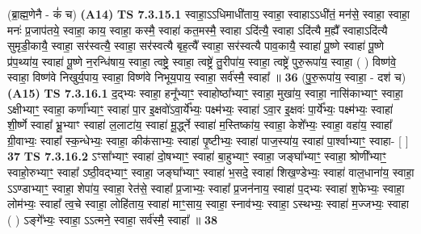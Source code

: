 \documentclass[17pt]{extarticle}
\begin{document}
                      (ब्रा॒ह्म॒णेनै - कं॑ च)  \textbf{(A14)} \newline \newline
                                        \textbf{ TS 7.3.15.1} \newline
                  स्वाहा॒ऽऽधिमाधी॑ताय॒ स्वाहा॒ स्वाहाऽऽधी॑तं॒ मन॑से॒ स्वाहा॒ स्वाहा॒ मनः॑ प्र॒जाप॑तये॒ स्वाहा॒ काय॒ स्वाहा॒ कस्मै॒ स्वाहा॑ कत॒मस्मै॒ स्वाहा ऽदि॑त्यै॒ स्वाहा ऽदि॑त्यै म॒ह्यै᳚ स्वाहाऽदि॑त्यै सुमृडी॒कायै॒ स्वाहा॒ सर॑स्वत्यै॒ स्वाहा॒ सर॑स्वत्यै बृह॒त्यै᳚ स्वाहा॒ सर॑स्वत्यै पाव॒कायै॒ स्वाहा॑ पू॒ष्णे स्वाहा॑ पू॒ष्णे प्र॑प॒थ्या॑य॒ स्वाहा॑ पू॒ष्णे न॒रन्धि॑षाय॒ स्वाहा॒ त्वष्ट्रे॒ स्वाहा॒ त्वष्ट्रे॑ तु॒रीपा॑य॒ स्वाहा॒ त्वष्ट्रे॑ पुरु॒रूपा॑य॒ स्वाहा॒ ( ) विष्ण॑वे॒ स्वाहा॒ विष्ण॑वे निखुर्य॒पाय॒ स्वाहा॒ विष्ण॑वे निभूय॒पाय॒ स्वाहा॒ सर्व॑स्मै॒ स्वाहा᳚ ॥ \textbf{  36 } \newline
                  \newline
                      (पु॒रु॒रूपा॑य॒ स्वाहा॒ - दश॑ च)  \textbf{(A15)} \newline \newline
                                        \textbf{ TS 7.3.16.1} \newline
                  द॒द्भ्यः स्वाहा॒ हनू᳚भ्याꣳ॒॒ स्वाहोष्ठा᳚भ्याꣳ॒॒ स्वाहा॒ मुखा॑य॒ स्वाहा॒ नासि॑काभ्याꣳ॒॒ स्वाहा॒ ऽक्षीभ्याꣳ॒॒ स्वाहा॒ कर्णा᳚भ्याꣳ॒॒ स्वाहा॑ पा॒र इ॒क्षवो॑ऽवा॒र्ये᳚भ्यः॒ पक्ष्म॑भ्यः॒ स्वाहा॑ ऽवा॒र इ॒क्षवः॑ पा॒र्ये᳚भ्यः॒ पक्ष्म॑भ्यः॒ स्वाहा॑ शी॒र्ष्णे स्वाहा᳚ भ्रू॒भ्याꣳ स्वाहा॑ ल॒लाटा॑य॒ स्वाहा॑ मू॒र्द्ध्ने स्वाहा॑ म॒स्तिष्का॑य॒ स्वाहा॒ केशे᳚भ्यः॒ स्वाहा॒ वहा॑य॒ स्वाहा᳚ ग्री॒वाभ्यः॒ स्वाहा᳚ स्क॒न्धेभ्यः॒ स्वाहा॒ कीक॑साभ्यः॒ स्वाहा॑ पृ॒ष्टीभ्यः॒ स्वाहा॑ पाज॒स्या॑य॒ स्वाहा॑ पा॒र्श्वाभ्याꣳ॒॒ स्वाहा- [  ] \textbf{  37} \newline
                  \newline
                                \textbf{ TS 7.3.16.2} \newline
                  ऽꣳसा᳚भ्याꣳ॒॒ स्वाहा॑ दो॒षभ्याꣳ॒॒ स्वाहा॑ बा॒हुभ्याꣳ॒॒ स्वाहा॒ जङ्घा᳚भ्याꣳ॒॒ स्वाहा॒ श्रोणी᳚भ्याꣳ॒॒ स्वाहो॒रुभ्याꣳ॒॒ स्वाहा᳚ ऽष्ठी॒वद्भ्याꣳ॒॒ स्वाहा॒ जङ्घा᳚भ्याꣳ॒॒ स्वाहा॑ भ॒सदे॒ स्वाहा॑ शिख॒ण्डेभ्यः॒ स्वाहा॑ वाल॒धाना॑य॒ स्वाहा॒ ऽऽण्डाभ्याꣳ॒॒ स्वाहा॒ शेपा॑य॒ स्वाहा॒ रेत॑से॒ स्वाहा᳚ प्र॒जाभ्यः॒ स्वाहा᳚ प्र॒जन॑नाय॒ स्वाहा॑ प॒द्भ्यः स्वाहा॑ श॒फेभ्यः॒ स्वाहा॒ लोम॑भ्यः॒ स्वाहा᳚ त्व॒चे स्वाहा॒ लोहि॑ताय॒ स्वाहा॑ माꣳ॒॒साय॒ स्वाहा॒ स्नाव॑भ्यः॒ स्वाहा॒ ऽस्थभ्यः॒ स्वाहा॑ म॒ज्जभ्यः॒ स्वाहा ( ) ऽङ्गे᳚भ्यः॒ स्वाहा॒ ऽऽत्मने॒ स्वाहा॒ सर्व॑स्मै॒ स्वाहा᳚ ॥ \textbf{  38} \newline
\end{document}
